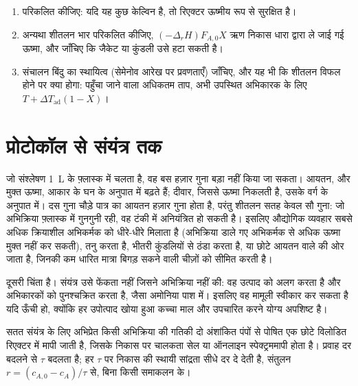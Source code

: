 \begin{method}[रिएक्टर का ऊष्मा संतुलन]\label{met:b2:continuous-reactors:heat-balance}
\begin{enumerate}
  \item {} परिकलित कीजिए: यदि यह कुछ केल्विन है, तो
        रिएक्टर ऊष्मीय रूप से सुरक्षित है।
  \item अन्यथा शीतलन भार परिकलित कीजिए, $(-\Delta_r H)F_{A,0}X$ ऋण
        निकास धारा द्वारा ले जाई गई ऊष्मा, और जाँचिए कि जैकेट या कुंडली
        उसे हटा सकती है।
  \item संचालन बिंदु का स्थायित्व (सेमेनोव
        आरेख पर प्रवणताएँ) जाँचिए, और यह भी कि शीतलन विफल होने पर क्या होगा: पहुँचा जाने वाला
        अधिकतम ताप, अभी उपस्थित अभिकारक के लिए $T + \Delta T_{\text{ad}}(1 - X)$।
\end{enumerate}
\end{method}

\section{प्रोटोकॉल से संयंत्र तक}

जो संश्लेषण \qty{1}{L} के फ़्लास्क में चलता है, वह बस हज़ार गुना बड़ा नहीं
किया जा सकता। आयतन, और मुक्त ऊष्मा, आकार के घन के अनुपात में बढ़ते हैं;
दीवार, जिससे ऊष्मा निकलती है, उसके वर्ग के अनुपात में। दस गुना चौड़े पात्र का
आयतन हज़ार गुना होता है, परंतु शीतलन सतह केवल सौ गुना: जो अभिक्रिया
फ़्लास्क में गुनगुनी रही, वह टंकी में अनियंत्रित हो सकती है। इसलिए औद्योगिक व्यवहार
सबसे अधिक क्रियाशील अभिकर्मक को धीरे-धीरे मिलाता है (अभिक्रिया डाले गए अभिकर्मक से अधिक
ऊष्मा मुक्त नहीं कर सकती), तनु करता है, भीतरी कुंडलियों से ठंडा करता है, या छोटे आयतन
वाले  की ओर जाता है, जिनकी कम धारित मात्रा बिगड़ सकने वाली चीज़ों को सीमित करती है।

 दूसरी चिंता है। संयंत्र उसे फेंकता नहीं जिसने अभिक्रिया नहीं
की: वह उत्पाद को अलग करता है और अभिकारकों को पुनश्चक्रित करता है, जैसा
अमोनिया पाश में। इसलिए वह मामूली  स्वीकार कर सकता है यदि
 ऊँची हो, क्योंकि हर उपोत्पाद खोया हुआ कच्चा माल और उपचारित करने
योग्य अपशिष्ट है।

\begin{inthelab}[मेज़ पर एक विलोडित टंकी]
सतत संयंत्र के लिए अभिप्रेत किसी अभिक्रिया की गतिकी दो अंशांकित पंपों से
पोषित एक छोटे विलोडित रिएक्टर में मापी जाती है, जिसके निकास पर चालकता सेल
या ऑनलाइन स्पेक्ट्रममापी होता है। प्रवाह दर बदलने से $\tau$ बदलता है;
हर $\tau$ पर निकास की स्थायी सांद्रता सीधे दर दे देती है, संतुलन
$r = (c_{A,0} - c_A)/\tau$ से, बिना किसी समाकलन के।
\end{inthelab}

